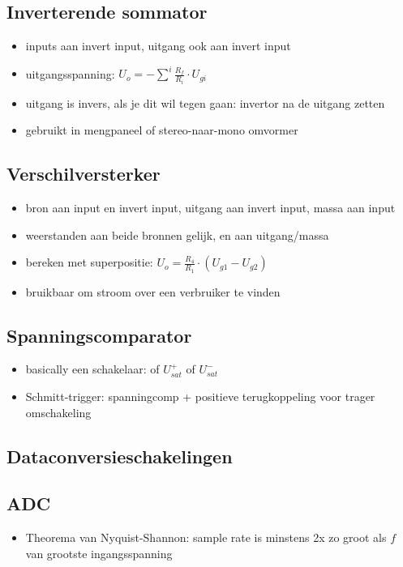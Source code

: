 \documentclass[11pt]{article}
\let\originalitem\item
\renewcommand{\item}{\originalitem[]}
\newcommand{\Newpage}{\end{preview}\begin{preview}}
\begin{document}
\begin{preview}
\Newpage
\section{Inverterende sommator}

\begin{itemize}
  \item inputs aan invert input, uitgang ook aan invert input
  \item uitgangsspanning: $ U_o = - \sum^i{\frac{R_f}{R_i}\cdot U_{gi}} $
  \item uitgang is invers, als je dit wil tegen gaan: invertor na de uitgang zetten
  \item gebruikt in mengpaneel of stereo-naar-mono omvormer
\end{itemize}

\Newpage
\section{Verschilversterker}

\begin{itemize}
  \item bron aan input en invert input, uitgang aan invert input, massa aan input
  \item weerstanden aan beide bronnen gelijk, en aan uitgang/massa
  \item bereken met superpositie: $ U_o = \frac{R_4}{R_1} \cdot (U_{g1} - U_{g2}) $
  \item bruikbaar om stroom over een verbruiker te vinden
\end{itemize}

\Newpage
\section{Spanningscomparator}

\begin{itemize}
  \item basically een schakelaar: of $ U_{sat}^+ $ of $ U_{sat}^- $
  \item Schmitt-trigger: spanningcomp + positieve terugkoppeling voor trager omschakeling
\end{itemize}

\Newpage
\section{Dataconversieschakelingen}

\subsection{ADC}
\begin{itemize}
  \item Theorema van Nyquist-Shannon: sample rate is minstens 2x zo groot als $f$ van grootste ingangsspanning
\end{itemize}


\end{preview}
\end{document}
